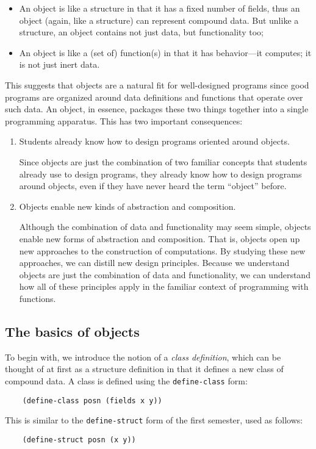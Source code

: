 \documentclass[submission,copyright]{eptcs}
\begin{document}
\begin{itemize}
\item An object is like a structure in that it has a fixed number of
fields, thus an object (again, like a structure) can represent
compound data. But unlike a structure, an object contains not just
data, but functionality too;

\item An object is like a (set of) function(s) in that it has behavior---it computes; it is
not just inert data.
\end{itemize}

This suggests that objects are a natural fit for well-designed programs
since good programs are organized around data definitions and
functions that operate over such data. An object, in essence, packages
these two things together into a single programming apparatus. This
has two important consequences:

\begin{enumerate}

\item Students already know how to design programs oriented around objects.

Since objects are just the combination of two familiar concepts that
students already use to design programs, they already know how to
design programs around objects, even if they have never heard the term
``object'' before.

\item Objects enable new kinds of abstraction and composition.

Although the combination of data and functionality may seem simple,
objects enable new forms of abstraction and composition. That is,
objects open up new approaches to the construction of computations. By
studying these new approaches, we can distill new design
principles. Because we understand objects are just the combination of
data and functionality, we can understand how all of these principles
apply in the familiar context of programming with functions. 
\end{enumerate}

\subsection{The basics of objects}

To begin with, we introduce the notion of a \emph{class definition},
which can be thought of at first as a structure definition in that
it defines a new class of compound data.  A class is defined using the
{\tt define-class} form:
\begin{verbatim}
    (define-class posn (fields x y))
\end{verbatim}
This is similar to the {\tt define-struct} form of the first semester,
used as follows:
\begin{verbatim}
    (define-struct posn (x y))
\end{verbatim}
\end{document}
